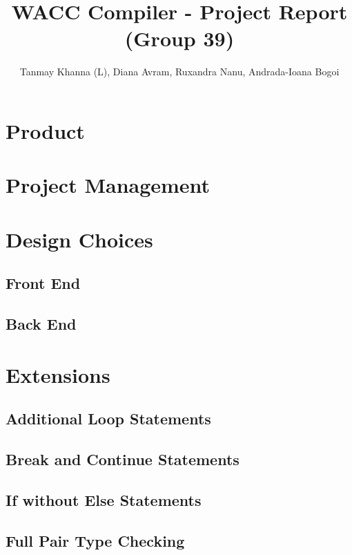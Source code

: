 \documentclass[12pt]{article}
\begin{document}
\title{WACC Compiler - Project Report (Group 39)}
\author{Tanmay Khanna (L), Diana Avram, Ruxandra Nanu, Andrada-Ioana Bogoi}

\maketitle

\section{Product}

\section{Project Management}

\section{Design Choices}
\subsection{Front End}
\subsection{Back End}
\section{Extensions}
\subsection{Additional Loop Statements}
\subsection{Break and Continue Statements}
\subsection{If without Else Statements}
\subsection{Full Pair Type Checking}

\end{document}
